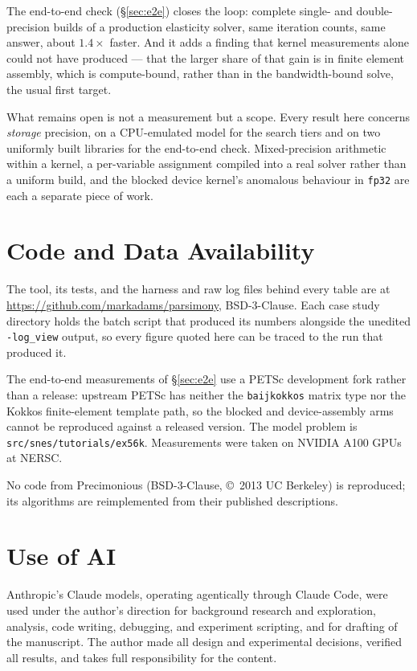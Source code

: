 \documentclass[11pt]{article}
\begin{document}
The end-to-end check (\S\ref{sec:e2e}) closes the loop: complete single- and
double-precision builds of a production elasticity solver, same iteration counts,
same answer, about $1.4\times$ faster. And it adds a finding that kernel measurements
alone could not have produced --- that the larger share of that gain is in
finite element assembly, which is compute-bound, rather than in the
bandwidth-bound solve, the usual first target.

What remains open is not a measurement but a scope. Every result here concerns
\emph{storage} precision, on a CPU-emulated model for the search tiers and on two
uniformly built libraries for the end-to-end check. Mixed-precision arithmetic
within a kernel, a per-variable assignment compiled into a real solver rather
than a uniform build, and the blocked device kernel's anomalous behaviour in
\texttt{fp32} are each a separate piece of work.

\section*{Code and Data Availability}

The tool, its tests, and the harness and raw log files behind every table are at
\url{https://github.com/markadams/parsimony}, BSD-3-Clause. Each case study
directory holds the batch script that produced its numbers alongside the
unedited \texttt{-log\_view} output, so every figure quoted here can be traced to
the run that produced it.

The end-to-end measurements of \S\ref{sec:e2e} use a PETSc development fork
rather than a release: upstream PETSc has neither the \texttt{baijkokkos} matrix
type nor
the Kokkos finite-element template path, so the blocked and device-assembly arms
cannot be reproduced against a released version. The model problem is
\texttt{src/snes/tutorials/ex56k}. Measurements were taken on NVIDIA A100 GPUs at
NERSC.

No code from Precimonious (BSD-3-Clause, \copyright~2013 UC Berkeley) is
reproduced; its algorithms are reimplemented from their published descriptions.

\section*{Use of AI}

Anthropic's Claude models, operating agentically through Claude Code, were used
under the author's direction for background research and exploration, analysis,
code writing, debugging, and experiment scripting, and for drafting of the
manuscript. The author made all design and experimental decisions, verified all
results, and takes full responsibility for the content.
\end{document}
